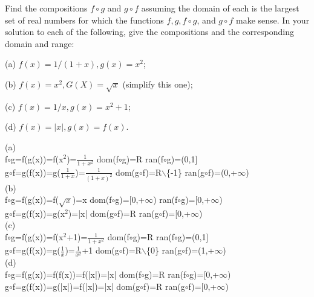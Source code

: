\documentclass[11pt, a4paper, UTF8]{ctexart}
\begin{document}
\begin{problem}[UD:15.1]
Find the compositions \(f \circ g\) and \(g \circ f\) assuming the domain of each is the largest set of real numbers for which the functions \(f,g,f \circ g\), and \(g \circ f\) make sense. In your solution to each of the following, give the compositions and the corresponding domain and range:

(a) \(f(x) = 1/(1+x), g(x) = x^{2}\);

(b) \(f(x) = x^{2}, G(X) = \sqrt{x}\) (simplify this one);

(c) \(f(x) = 1/x, g(x) = x^{2} + 1\);

(d) \(f(x) = |x|,g(x) = f(x)\).
\end{problem}
\begin{solution}
(a)\\
f$\circ$g=f(g(x))=f(x$^2$)=$\frac{1}{1+x^2}$  dom(f$\circ$g)=R ran(f$\circ$g)=(0,1]\\
g$\circ$f=g(f(x))=g($\frac{1}{1+x}$)=$\frac{1}{(1+x)^2}$  dom(g$\circ$f)=R$\backslash$\{-1\}  ran(g$\circ$f)=(0,+$\infty$)\\
(b)\\
f$\circ$g=f(g(x))=f($\sqrt{x}$)=x  dom(f$\circ$g)=[0,+$\infty$) ran(f$\circ$g)=[0,+$\infty$)\\
g$\circ$f=g(f(x))=g(x$^2$)=|x| dom(g$\circ$f)=R  ran(g$\circ$f)=[0,+$\infty$)\\
(c)\\
f$\circ$g=f(g(x))=f(x$^2$+1)=$\frac{1}{1+x^2}$  dom(f$\circ$g)=R ran(f$\circ$g)=(0,1]\\
g$\circ$f=g(f(x))=g($\frac{1}{x}$)=$\frac{1}{x^2}$+1  dom(g$\circ$f)=R$\backslash$\{0\}  ran(g$\circ$f)=(1,+$\infty$)\\
(d)\\
f$\circ$g=f(g(x))=f(f(x))=f(|x|)=|x|  dom(f$\circ$g)=R ran(f$\circ$g)=[0,+$\infty$)\\
g$\circ$f=g(f(x))=g(|x|)=f(|x|)=|x| dom(g$\circ$f)=R  ran(g$\circ$f)=[0,+$\infty$)\\
\end{solution}
\end{document}
